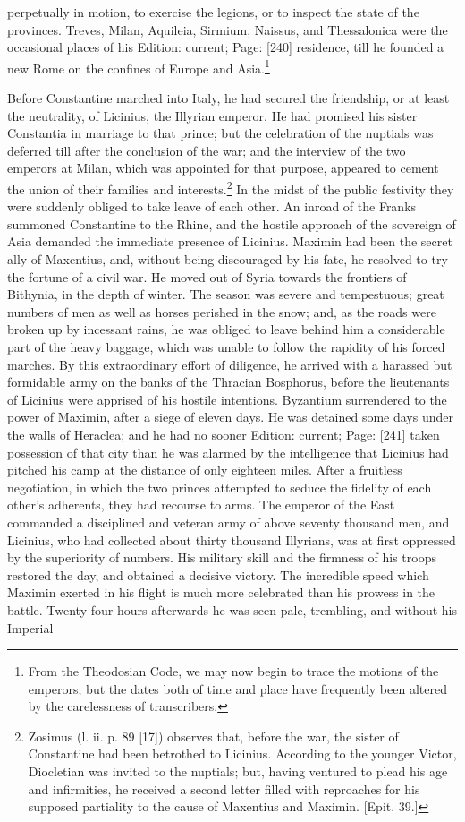 perpetually in motion, to exercise the legions, or to inspect the state of the provinces. Treves, Milan, Aquileia, Sirmium, Naissus, and Thessalonica were the occasional places of his Edition: current; Page: [240] residence, till he founded a new Rome on the confines of Europe and Asia.\footnote{From the Theodosian Code, we may now begin to trace the motions of the emperors; but the dates both of time and place have frequently been altered by the carelessness of transcribers.}

Before Constantine marched into Italy, he had secured the friendship, or at least the neutrality, of Licinius, the Illyrian emperor. He had promised his sister Constantia in marriage to that prince; but the celebration of the nuptials was deferred till after the conclusion of the war; and the interview of the two emperors at Milan, which was appointed for that purpose, appeared to cement the union of their families and interests.\footnote{Zosimus (l. ii. p. 89 [17]) observes that, before the war, the sister of Constantine had been betrothed to Licinius. According to the younger Victor, Diocletian was invited to the nuptials; but, having ventured to plead his age and infirmities, he received a second letter filled with reproaches for his supposed partiality to the cause of Maxentius and Maximin. [Epit. 39.]} In the midst of the public festivity they were suddenly obliged to take leave of each other. An inroad of the Franks summoned Constantine to the Rhine, and the hostile approach of the sovereign of Asia demanded the immediate presence of Licinius. Maximin had been the secret ally of Maxentius, and, without being discouraged by his fate, he resolved to try the fortune of a civil war. He moved out of Syria towards the frontiers of Bithynia, in the depth of winter. The season was severe and tempestuous; great numbers of men as well as horses perished in the snow; and, as the roads were broken up by incessant rains, he was obliged to leave behind him a considerable part of the heavy baggage, which was unable to follow the rapidity of his forced marches. By this extraordinary effort of diligence, he arrived with a harassed but formidable army on the banks of the Thracian Bosphorus, before the lieutenants of Licinius were apprised of his hostile intentions. Byzantium surrendered to the power of Maximin, after a siege of eleven days. He was detained some days under the walls of Heraclea; and he had no sooner Edition: current; Page: [241] taken possession of that city than he was alarmed by the intelligence that Licinius had pitched his camp at the distance of only eighteen miles. After a fruitless negotiation, in which the two princes attempted to seduce the fidelity of each other\texthebrew{}’s adherents, they had recourse to arms. The emperor of the East commanded a disciplined and veteran army of above seventy thousand men, and Licinius, who had collected about thirty thousand Illyrians, was at first oppressed by the superiority of numbers. His military skill and the firmness of his troops restored the day, and obtained a decisive victory. The incredible speed which Maximin exerted in his flight is much more celebrated than his prowess in the battle. Twenty-four hours afterwards he was seen pale, trembling, and without his Imperial 
